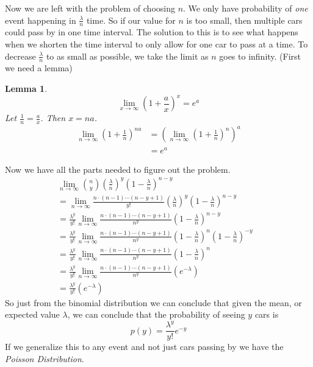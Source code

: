 \documentclass{article}
\newtheorem*{lemma}{Lemma}
\begin{document}
\begin{multicols}{2}
Now we are left with the problem of choosing $n$. We only have probability of \textit{one} event happening in $\frac{\lambda}{n}$ time. So if our value for $n$ is too small, then multiple cars could pass by in one time interval. The solution to this is to see what happens when we shorten the time interval to only allow for one car to pass at a time. To decrease $\frac{\lambda}{n}$ to as small as possible, we take the limit as $n$ goes to infinity. (First we need a lemma)
\begin{lemma}
$$\lim_{x \to \infty} \left( 1 + \frac{a}{x} \right)^{x} = e^a$$
Let $\displaystyle \frac{1}{n} = \displaystyle \frac{a}{x}$. Then $x = na$.
\begin{align*}
\lim_{n \to \infty} \left( 1 + \frac{1}{n} \right)^{na} &=  \left( \lim_{n \to \infty}(1 + \frac{1}{n} )^{n} \right)^a\\
&= e^a
\end{align*}
\end{lemma}
\vfill
\columnbreak
Now we have all the parts needed to figure out the problem.
\begin{align*}
  &\lim_{n \to \infty} {n \choose y}\left(\frac{\lambda}{n}\right)^{y}\left(1 - \frac{\lambda}{n}\right)^{n-y}\\
  &=\lim_{n \to \infty}\frac{n \cdot (n - 1) \cdots (n - y + 1)}{y!} \left( \frac{\lambda}{n} \right)^y \left(1 - \frac{\lambda}{n} \right)^{n-y}\\
  &= \frac{\lambda^y}{y!} \lim_{n \to \infty}\frac{n \cdot (n - 1) \cdots (n - y + 1)}{n^y} \left(1 - \frac{\lambda}{n} \right)^{n-y}\\
  &= \frac{\lambda^y}{y!} \lim_{n \to \infty}\frac{n \cdot (n - 1) \cdots (n - y + 1)}{n^y} \left(1 - \frac{\lambda}{n} \right)^{n} \left(1 - \frac{\lambda}{n} \right)^{-y}\\
  &= \frac{\lambda^y}{y!} \lim_{n \to \infty}\frac{n \cdot (n - 1) \cdots (n - y + 1)}{n^y} \left(1 - \frac{\lambda}{n} \right)^{n} &&\\
  &= \frac{\lambda^y}{y!} \lim_{n \to \infty}\frac{n \cdot (n - 1) \cdots (n - y + 1)}{n^y} \left( e^{-\lambda} \right)\\
  &= \frac{\lambda^y}{y!} \left( e^{-\lambda} \right)
\end{align*}
So just from the binomial distribution we can conclude that given the mean, or expected value $\lambda$, we can conclude that the probability of seeing $y$ cars is
$$
 p(y) = \displaystyle \frac{\lambda^y}{y!} e^{-y}
$$
If we generalize this to any event and not just cars passing by we have the \textit{Poisson Distribution}.
\end{multicols}
\end{document}
